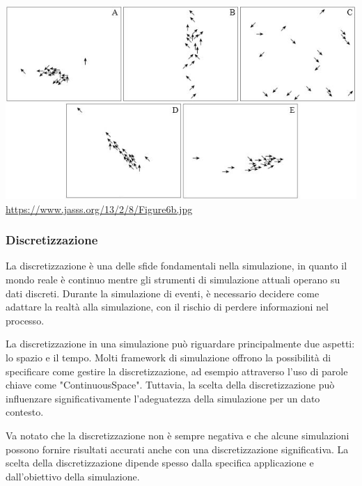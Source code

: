 \begin{minipage}{\linewidth}
    \centering
    \includegraphics{img/Figure6b.jpg}
    \url{https://www.jasss.org/13/2/8/Figure6b.jpg}
    \label{fig:flock_emergent_behaviour}
\end{minipage}

\subsubsection{Discretizzazione}

La discretizzazione è una delle sfide fondamentali nella simulazione, 
in quanto il mondo reale è continuo mentre gli strumenti di simulazione 
attuali operano su dati discreti. Durante la simulazione di eventi, 
è necessario decidere come adattare la realtà alla simulazione, 
con il rischio di perdere informazioni nel processo.

La discretizzazione in una simulazione può riguardare principalmente 
due aspetti: lo spazio e il tempo. Molti framework di simulazione offrono 
la possibilità di specificare come gestire la discretizzazione, 
ad esempio attraverso l'uso di parole chiave come "ContinuousSpace". 
Tuttavia, la scelta della discretizzazione può influenzare 
significativamente l'adeguatezza della simulazione per un dato contesto.

Va notato che la discretizzazione non è sempre negativa e che alcune 
simulazioni possono fornire risultati accurati anche con una 
discretizzazione significativa. La scelta della discretizzazione 
dipende spesso dalla specifica applicazione e dall'obiettivo della simulazione.

